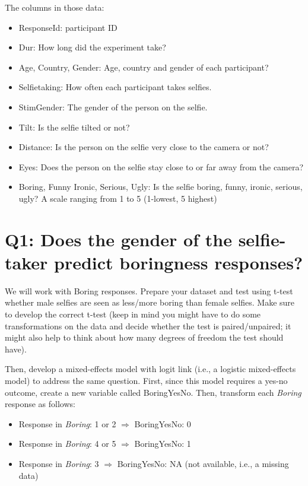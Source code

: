 \documentclass{article}\usepackage[]{graphicx}\usepackage[]{color}
\begin{document}
The columns in those data:
\begin{itemize}
    \item ResponseId: participant ID
    \item Dur: How long did the experiment take?
    \item Age, Country, Gender: Age, country and gender of each participant?
    \item Selfietaking: How often each participant takes selfies.
    \item StimGender: The gender of the person on the selfie.
    \item Tilt: Is the selfie tilted or not?
    \item Distance: Is the person on the selfie very close to the camera or not?
    \item Eyes: Does the person on the selfie stay close to or far away from the camera?
    \item Boring, Funny Ironic, Serious, Ugly: Is the selfie boring, funny, ironic, serious, ugly? A scale ranging from 1 to 5 (1-lowest, 5 highest)
\end{itemize}


\section*{Q1: Does the gender of the selfie-taker predict boringness responses?} 

We will work with Boring responses. Prepare your dataset and test using t-test whether male selfies are seen as less/more  boring than female selfies. Make sure to develop the correct t-test (keep in mind you might have to do some transformations on the data and decide whether the test is paired/unpaired; it might also help to think about how many degrees of freedom the test should have).

Then, develop a mixed-effects model with logit link (i.e., a logistic mixed-effects model) to address the same question. First, since this model requires a yes-no outcome, create a new variable called BoringYesNo. Then, transform each \textit{Boring} response as follows:
\begin{itemize}
    \item Response in \textit{Boring}: 1 or 2 $\Rightarrow$ BoringYesNo: 0
    \item Response in \textit{Boring}: 4 or 5 $\Rightarrow$ BoringYesNo: 1
    \item Response in \textit{Boring}: 3 $\Rightarrow$ BoringYesNo: NA (not available, i.e., a missing data)
\end{itemize}
\end{document}
